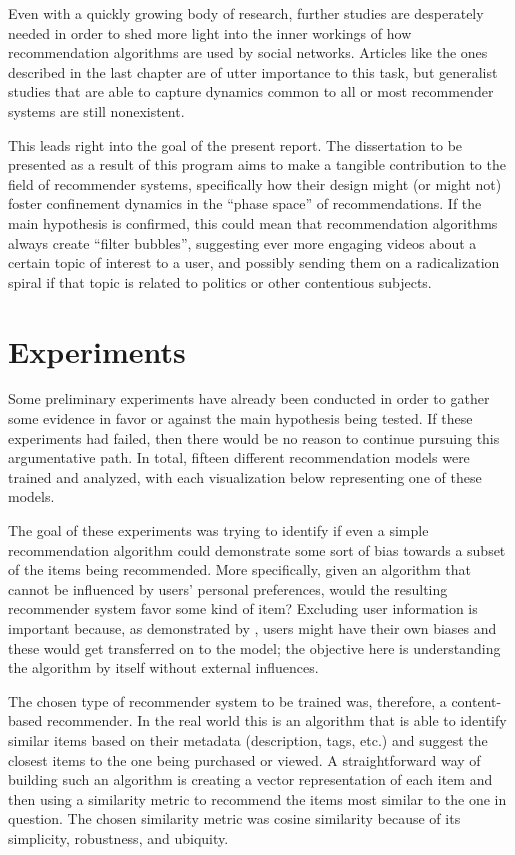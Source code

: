 Even with a quickly growing body of research, further studies are desperately
needed in order to shed more light into the inner workings of how recommendation
algorithms are used by social networks. Articles like the ones described in the
last chapter are of utter importance to this task, but generalist studies that
are able to capture dynamics common to all or most recommender systems are still
nonexistent.

This leads right into the goal of the present report. The dissertation to be
presented as a result of this program aims to make a tangible contribution to
the field of recommender systems, specifically how their design might (or might
not) foster confinement dynamics in the ``phase space'' of recommendations. If
the main hypothesis is confirmed, this could mean that recommendation algorithms
always create ``filter bubbles'', suggesting ever more engaging videos about a
certain topic of interest to a user, and possibly sending them on a
radicalization spiral if that topic is related to politics or other contentious
subjects.

\section{Experiments}
\label{sec:experiments}

Some preliminary experiments have already been conducted in order to gather some
evidence in favor or against the main hypothesis being tested. If these
experiments had failed, then there would be no reason to continue pursuing this
argumentative path. In total, fifteen different recommendation models were
trained and analyzed, with each visualization below representing one of these
models.

The goal of these experiments was trying to identify if even a simple
recommendation algorithm could demonstrate some sort of bias towards a subset of
the items being recommended. More specifically, given an algorithm that cannot
be influenced by users' personal preferences, would the resulting recommender
system favor some kind of item? Excluding user information is important because,
as demonstrated by \citet{stoica_algorithmic_2018}, users might have their own
biases and these would get transferred on to the model; the objective here is
understanding the algorithm by itself without external influences.

The chosen type of recommender system to be trained was, therefore, a
content-based recommender. In the real world this is an algorithm that is able
to identify similar items based on their metadata (description, tags, etc.) and
suggest the closest items to the one being purchased or viewed. A
straightforward way of building such an algorithm is creating a vector
representation of each item and then using a similarity metric to recommend the
items most similar to the one in question. The chosen similarity metric was
cosine similarity because of its simplicity, robustness, and ubiquity.


